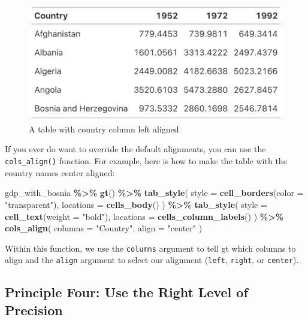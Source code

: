 \documentclass[
]{book}
\newenvironment{Shaded}{\begin{snugshade}}{\end{snugshade}}
\newcommand{\AttributeTok}[1]{\textcolor[rgb]{0.13,0.29,0.53}{#1}}
\newcommand{\FunctionTok}[1]{\textcolor[rgb]{0.13,0.29,0.53}{\textbf{#1}}}
\newcommand{\NormalTok}[1]{#1}
\newcommand{\SpecialCharTok}[1]{\textcolor[rgb]{0.81,0.36,0.00}{\textbf{#1}}}
\newcommand{\StringTok}[1]{\textcolor[rgb]{0.31,0.60,0.02}{#1}}
\begin{document}
\begin{figure}
\includegraphics[width=1\linewidth]{nostarch/temp/F05008} \caption{A table with country column left aligned}\label{fig:table-country-left}
\end{figure}

If you ever do want to override the default alignments, you can use the \texttt{cols\_align()} function. For example, here is how to make the table with the country names center aligned:

\begin{Shaded}
\begin{Highlighting}[]
\NormalTok{gdp\_with\_bosnia }\SpecialCharTok{\%\textgreater{}\%}
  \FunctionTok{gt}\NormalTok{() }\SpecialCharTok{\%\textgreater{}\%}
  \FunctionTok{tab\_style}\NormalTok{(}
    \AttributeTok{style =} \FunctionTok{cell\_borders}\NormalTok{(}\AttributeTok{color =} \StringTok{"transparent"}\NormalTok{),}
    \AttributeTok{locations =} \FunctionTok{cells\_body}\NormalTok{()}
\NormalTok{  ) }\SpecialCharTok{\%\textgreater{}\%}
  \FunctionTok{tab\_style}\NormalTok{(}
    \AttributeTok{style =} \FunctionTok{cell\_text}\NormalTok{(}\AttributeTok{weight =} \StringTok{"bold"}\NormalTok{),}
    \AttributeTok{locations =} \FunctionTok{cells\_column\_labels}\NormalTok{()}
\NormalTok{  ) }\SpecialCharTok{\%\textgreater{}\%}
  \FunctionTok{cols\_align}\NormalTok{(}
    \AttributeTok{columns =} \StringTok{"Country"}\NormalTok{,}
    \AttributeTok{align =} \StringTok{"center"}
\NormalTok{  )}
\end{Highlighting}
\end{Shaded}

Within this function, we use the \texttt{columns} argument to tell gt which columns to align and the \texttt{align} argument to select our alignment (\texttt{left}, \texttt{right}, or \texttt{center}).

\hypertarget{principle-four-use-the-right-level-of-precision}{%
\subsection*{Principle Four: Use the Right Level of Precision}\label{principle-four-use-the-right-level-of-precision}}
\end{document}
